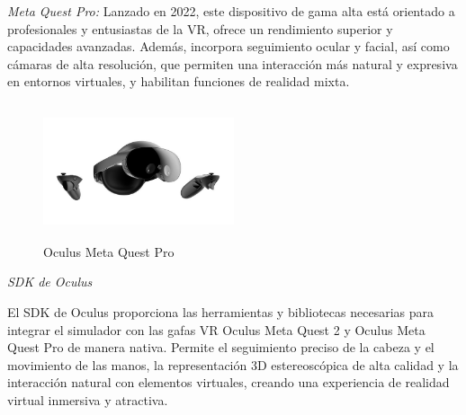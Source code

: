 \textit{Meta Quest Pro:} Lanzado en 2022, este dispositivo de gama alta está orientado a profesionales y entusiastas de la VR, ofrece un rendimiento superior y capacidades avanzadas. Además, incorpora seguimiento ocular y facial, así como cámaras de alta resolución, que permiten una interacción más natural y expresiva en entornos virtuales, y habilitan funciones de realidad mixta.

\begin{figure}[thbp]
    \centering
    \includegraphics[width=0.5\textwidth, height = 4cm]{img/chapter03/Meta_Quest_Pro.png}
    \caption{Oculus Meta Quest Pro}
    \label{fig:Oculus_Meta_Quest_Pro}
\end{figure}

\textit{SDK de Oculus}

El SDK de Oculus proporciona las herramientas y bibliotecas necesarias para integrar el simulador con las gafas VR Oculus Meta Quest 2 y Oculus Meta Quest Pro de manera nativa. Permite el seguimiento preciso de la cabeza y el movimiento de las manos, la representación 3D estereoscópica de alta calidad y la interacción natural con elementos virtuales, creando una experiencia de realidad virtual inmersiva y atractiva.


